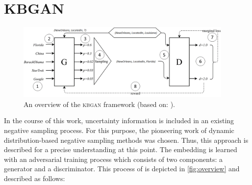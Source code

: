 \section{KBGAN} 
\label{sec:kbgan}
%
\begin{figure}[H]
  \centering
    \includegraphics[width=0.95\textwidth]{figures/kbgan_original.png}
  \caption{An overview of the \textsc{kbgan} framework (based on: \cite{cai2017kbgan}).}
  \label{fig:overview}
\end{figure}
In the course of this work, uncertainty information is included in an existing negative sampling process.
For this purpose, the pioneering work of dynamic distribution-based negative sampling methods \kbgan was chosen.
Thus, this approach is described for a precise understanding at this point.
The embedding is learned with an adversarial training process which consists of two components: a generator and a discriminator.
This process of \kbgan is depicted in \autoref{fig:overview} and described as follows:

